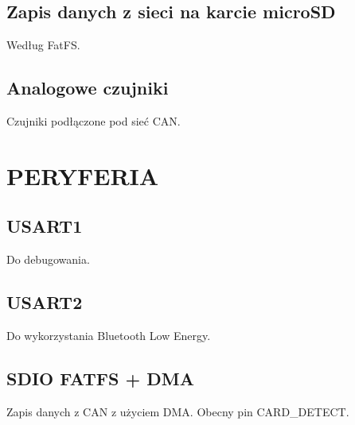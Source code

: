 \documentclass[12pt, a4paper, polish]{article}
\begin{document}
	\subsection{Zapis danych z sieci na karcie microSD}
	Według FatFS.
	
	\subsection{Analogowe czujniki}
	Czujniki podłączone pod sieć CAN.
	
\section{PERYFERIA}
\subsection{USART1}
Do debugowania. 

\subsection{USART2}
Do wykorzystania Bluetooth Low Energy.

\subsection{SDIO FATFS + DMA}
Zapis danych z CAN z użyciem DMA. Obecny pin CARD\_DETECT. 
	
	
	
\end{document}
